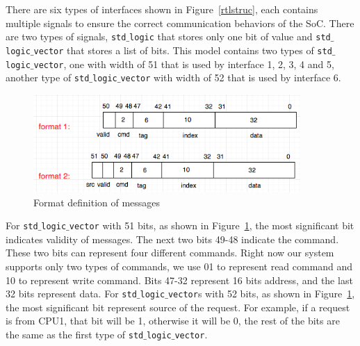 \documentclass[12pt,frontmatter,copyright,thesis]{usfmanus}
\begin{document}
There are six types of interfaces shown in Figure~\ref{rtlstruc}, each contains multiple signals
to ensure the correct communication behaviors of the SoC.
There are two types of signals, {\tt std$\_$logic} that stores only one bit of value and  {\tt std$\_$logic$\_$vector} that
stores a list of bits. This model contains two types of {\tt std$\_$logic$\_$vector}, one with width of 51 that
is used by interface 1, 2, 3, 4 and 5,  another type of {\tt std$\_$logic$\_$vector}
with width of 52 that is used by interface 6.
  \begin{figure}[h]
\centerline{
\includegraphics[width=4in]{signalline.png}
}
\caption{Format definition of messages}
\label{sigline}
\end{figure}
For {\tt std$\_$logic$\_$vector} with 51 bits, as shown in Figure~\ref{sigline},
the most significant bit indicates validity of messages.
The next
two bits 49-48 indicate the command. These two bits can represent four different commands.
Right now our
system supports only two types of commands,
we use 01 to represent read command and 10 to represent write command.
Bits 47-32 represent 16 bits address, and the last 32 bits represent data.
For {\tt std$\_$logic$\_$vector}s with 52 bits, as shown in Figure~\ref{sigline},
the most significant bit represent source of the request. For example, if a request is from CPU1, that bit
will be 1, otherwise it will be 0, the rest of the bits are the same as the first type of {\tt std$\_$logic$\_$vector}.

\end{document}
